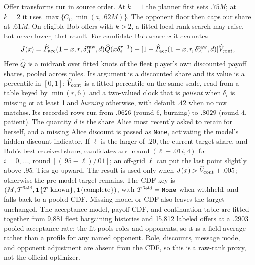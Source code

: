 Offer transforms run in source order. At $k=1$ the planner first sets $.75M$;
at $k=2$ it uses $\max\{C_i,\min(a,.62M)\}$. The opponent floor then caps our
share at $.61M$. On eligible Bob offers with $k>2$, a fitted local-rank search
may raise, but never lower, that result. For candidate Bob share $x$ it evaluates
\begin{equation}
J(x)=\widehat P_{\rm acc}(1-x,r,\delta_A^{\rm raw},d)\widehat Q(x\delta_i^{r-1})
+[1-\widehat P_{\rm acc}(1-x,r,\delta_A^{\rm raw},d)]\widehat V_{\rm cont},
\label{eq:banked-bob-search}
\end{equation}
Here $\widehat Q$ is a midrank over fitted knots of the fleet player's own
discounted payoff shares, pooled across roles. Its argument is a discounted
share and its value is a percentile in
$[0,1]$; $\widehat V_{\rm cont}$ is a fitted percentile on the same scale,
read from a table keyed by $\min(r,6)$ and a two-valued clock that is
\emph{patient} when $\delta_i$ is missing or at least 1 and \emph{burning}
otherwise, with default $.42$ when no row matches. Its recorded rows run from
$.0626$ (round 6, burning) to $.8029$ (round 4, patient). The quantity $d$ is
the share Alice most recently asked to retain for herself, and a missing Alice
discount is passed as \texttt{None}, activating the model's hidden-discount
indicator. If
$\ell$ is the larger of $.20$, the current target share, and Bob's best received
share, candidates are $\operatorname{round}(\ell+.01i,4)$ for
$i=0,\ldots,\operatorname{round}[(.95-\ell)/.01]$; an off-grid $\ell$ can put
the last point slightly above $.95$. Ties go upward. The result is used only
when $J(x)>\widehat V_{\rm cont}+.005$; otherwise the pre-model target remains.
The CDF key is $(M,T^{\rm field},\mathbf1\{T\text{ known}\},
\mathbf1\{\text{complete}\})$, with $T^{\rm field}=\texttt{None}$ when
withheld, and falls back to a pooled CDF. Missing model or CDF also leaves the
target unchanged. The acceptance model, payoff CDF, and continuation table are
fitted together from 9,881 fleet bargaining histories and 15,812 labeled offers
at a $.2903$ pooled acceptance rate; the fit pools roles and opponents, so it is
a field average rather than
a profile for any named opponent. Role, discounts, message mode, and opponent adjustment are
absent from the CDF, so this is a raw-rank proxy, not the official optimizer.

